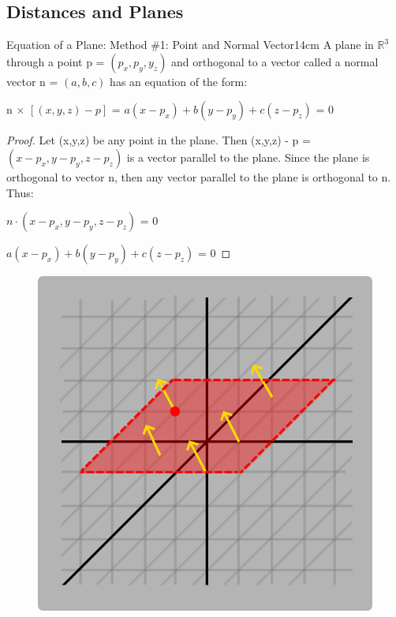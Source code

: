     \newpage





\subsection{ Distances and Planes }

    \begin{wtheorem}{Equation of a Plane: Method \#1: Point and Normal Vector}{14cm}
        A plane in $\mathbb{R}^3$ through a point p = $(p_x,p_y,y_z)$
        and orthogonal to a vector called a normal vector
        n = $(a,b,c)$ has an equation of the form:

        \hspace{0.5cm}
        n $\times$ $[(x,y,z)-p]$ = $a(x-p_x) + b(y-p_y) + c(z-p_z)$ = 0
    \end{wtheorem}

    \begin{proof}
        Let (x,y,z) be any point in the plane.
        Then (x,y,z) - p = $(x-p_x,y-p_y,z-p_z)$ is a vector
        parallel to the plane. Since the plane is orthogonal to vector n,
        then any vector parallel to the plane is orthogonal to n. Thus:

        \hspace{0.5cm}
        $n \cdot (x-p_x,y-p_y,z-p_z)$ = 0

        \hspace{0.5cm}
        $ a(x-p_x) + b(y-p_y) + c(z-p_z)$ = 0
    \end{proof}

    \begin{figure}[h]
        \centering
        \includegraphics[scale=0.3]{Images/1.4.1.png}
    \end{figure}



